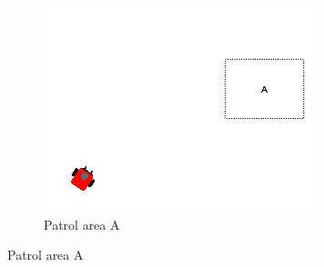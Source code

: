 \documentclass[]{article}
\begin{document}
\begin{figure}
\begin{subfigure}{0.42\textwidth}
		\centering
		\includegraphics[width=\linewidth]{slide_images/Swarm_Robot_Control_-_Single_Robot_0023.png}
		\caption{Patrol area A}
		\label{fig:sub1}
	\end{subfigure}
	\label{fig:single_robot_slides_pt2}
\end{figure}
\end{document}
